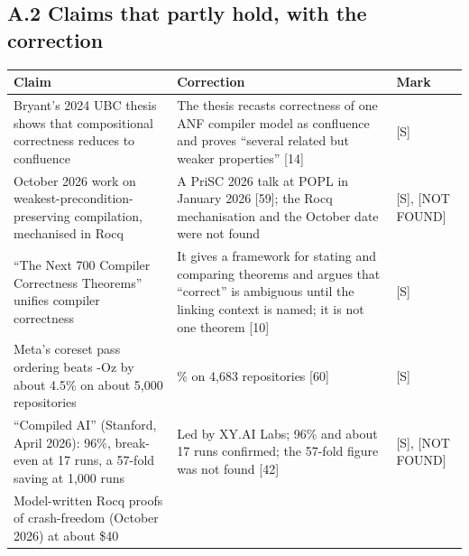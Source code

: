 \documentclass[10pt,letterpaper]{article}
\begin{document}
\subsection{A.2 Claims that partly hold, with the
correction}\label{a.2-claims-that-partly-hold-with-the-correction}

{\footnotesize\setlength{\tabcolsep}{3.8pt}\renewcommand{\arraystretch}{1.15}
\begin{longtable}[]{@{}
  >{\raggedright\arraybackslash}p{}
  >{\raggedright\arraybackslash}p{}
  >{\raggedright\arraybackslash}p{}@{}}
\toprule\noalign{}
\begin{minipage}[b]{\linewidth}\raggedright
\textbf{Claim}
\end{minipage} & \begin{minipage}[b]{\linewidth}\raggedright
\textbf{Correction}
\end{minipage} & \begin{minipage}[b]{\linewidth}\raggedright
\textbf{Mark}
\end{minipage} \\
\midrule\noalign{}
\endhead
\bottomrule\noalign{}
\endlastfoot
Bryant's 2024 UBC thesis shows that compositional correctness reduces to
confluence & The thesis recasts correctness of one ANF compiler model as
confluence and proves ``several related but weaker properties'' {[}14{]}
& {[}S{]} \\
October 2026 work on weakest-precondition-preserving compilation,
mechanised in Rocq & A PriSC 2026 talk at POPL in January 2026 {[}59{]};
the Rocq mechanisation and the October date were not found & {[}S{]},
{[}NOT FOUND{]} \\
``The Next 700 Compiler Correctness Theorems'' unifies compiler
correctness & It gives a framework for stating and comparing theorems
and argues that ``correct'' is ambiguous until the linking context is
named; it is not one theorem {[}10{]} & {[}S{]} \\
Meta's coreset pass ordering beats -Oz by about 4.5\% on about 5,000
repositories & 4.7\% on 4,683 repositories {[}60{]} & {[}S{]} \\
``Compiled AI'' (Stanford, April 2026): 96\%, break-even at 17 runs, a
57-fold saving at 1,000 runs & Led by XY.AI Labs; 96\% and about 17 runs
confirmed; the 57-fold figure was not found {[}42{]} & {[}S{]}, {[}NOT
FOUND{]} \\
Model-written Rocq proofs of crash-freedom (October 2026) at about \$40

\end{longtable}}
\end{document}
